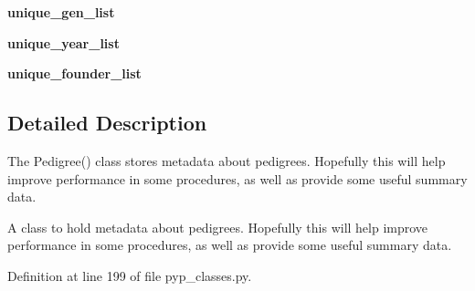 \begin{DoxyCompactItemize}
\item 
\hypertarget{classPyPedal_1_1pyp__classes_1_1Pedigree_ad7407edfa4137d35c03a219e7bb6e12f}{
{\bfseries unique\_\-gen\_\-list}}
\label{classPyPedal_1_1pyp__classes_1_1Pedigree_ad7407edfa4137d35c03a219e7bb6e12f}

\item 
\hypertarget{classPyPedal_1_1pyp__classes_1_1Pedigree_a879e092db5cd36a44d60ba96e536346a}{
{\bfseries unique\_\-year\_\-list}}
\label{classPyPedal_1_1pyp__classes_1_1Pedigree_a879e092db5cd36a44d60ba96e536346a}

\item 
\hypertarget{classPyPedal_1_1pyp__classes_1_1Pedigree_a691b90a99107c293d97b6d8611781beb}{
{\bfseries unique\_\-founder\_\-list}}
\label{classPyPedal_1_1pyp__classes_1_1Pedigree_a691b90a99107c293d97b6d8611781beb}

\end{DoxyCompactItemize}


\subsection{Detailed Description}
The Pedigree() class stores metadata about pedigrees. Hopefully this will help improve performance in some procedures, as well as provide some useful summary data. \begin{DoxyVerb}A class to hold metadata about pedigrees.  Hopefully this will help improve performance in some procedures, as well as
provide some useful summary data.\end{DoxyVerb}
 

Definition at line 199 of file pyp\_\-classes.py.



